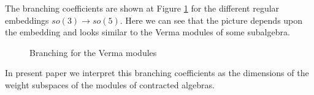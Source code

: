 \documentclass[12pt]{article}
\theoremstyle{definition}
\begin{document}
The branching coefficients are shown at Figure \ref{fig:B2_Verma_Branch2} for the different regular embeddings $so(3)\to so(5)$. Here we can see that the picture depends upon the embedding and looks similar to the Verma modules of some subalgebra.
\begin{figure}[h!bt]
  \noindent{}
  \caption{Branching for the Verma modules}
  
  \label{fig:B2_Verma_Branch2}
\end{figure}
In present paper we interpret this branching coefficients as the dimensions of the weight subspaces of the modules of contracted algebras.
\end{document}
